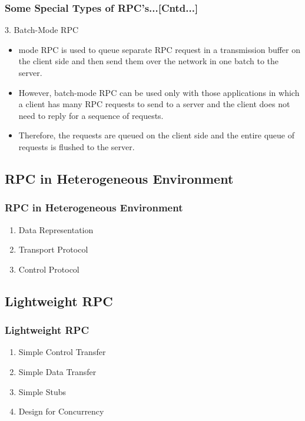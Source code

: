 \documentclass{beamer}
\begin{document}
\begin{frame}
	\frametitle{Some Special Types of RPC's...[Cntd...]}
	\vspace{0.5cm}
	3. Batch-Mode RPC\\
	\vspace{0.5cm}
	\begin{itemize}
		\item{mode RPC is used to queue separate RPC request in a transmission 
		buffer on the client side and then send them over the network in one batch to the 
		server.}\\
		\vspace{0.5cm}
		\item{However, batch-mode RPC can be used only with those applications in which a 
		client has many RPC requests to send to a server and the client does not need to 
		reply for a sequence of requests.}\\
		\vspace{0.5cm}
		\item{Therefore, the requests are queued on the client side and the entire queue 
		of 	requests is flushed to the server.}

	\end{itemize}
		\vspace{1.8cm}
\end{frame}


\subsection{RPC in Heterogeneous Environment}
\begin{frame}
	\frametitle{RPC in Heterogeneous Environment}
	\vspace{0.5cm}
	\begin{enumerate}
		\item Data Representation
		\item Transport Protocol
		\item Control Protocol
	\end{enumerate}
	\vspace{3cm}
\end{frame}


\subsection{Lightweight RPC}
\begin{frame}
	\frametitle{Lightweight RPC}
	\begin{enumerate}
		\item Simple Control Transfer
		\item Simple Data Transfer
		\item Simple Stubs
		\item Design for Concurrency
	\end{enumerate}
	\vspace{4cm}
\end{frame}
\end{document}
